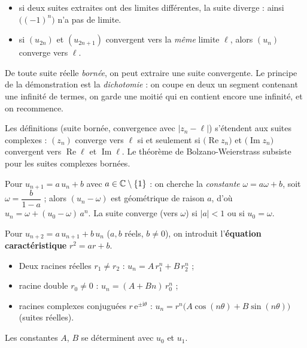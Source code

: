 \begin{propriete}
\begin{itemize}[label={\color{otNavy}\textbullet},leftmargin=1.4em,itemsep=0.6mm,topsep=0.8mm]
  \item {} si deux suites extraites ont des limites
    différentes, la suite diverge : ainsi $\bigl((-1)^{n}\bigr)$ n'a pas de
    limite.
  \item {} si $(u_{2n})$ et $(u_{2n+1})$ convergent vers la
    \emph{même} limite $\ell$, alors $(u_n)$ converge vers $\ell$.
\end{itemize}
\end{propriete}

\begin{theoreme}
De toute suite réelle \emph{bornée}, on peut extraire une suite convergente.
Le principe de la démonstration est la \emph{dichotomie} : on coupe en deux
un segment contenant une infinité de termes, on garde une moitié qui en
contient encore une infinité, et on recommence.
\end{theoreme}

\begin{definition}
Les définitions (suite bornée, convergence avec $|z_n-\ell|$) s'étendent aux
suites complexes : $(z_n)$ converge vers $\ell$ si et seulement si
$\bigl(\operatorname{Re}z_n\bigr)$ et $\bigl(\operatorname{Im}z_n\bigr)$
convergent vers $\operatorname{Re}\ell$ et $\operatorname{Im}\ell$.
Le théorème de Bolzano-Weierstrass subsiste pour les suites complexes
bornées.
\end{definition}


\begin{propriete}
Pour $u_{n+1}=a\,u_n+b$ avec $a\in\mathbb{C}\setminus\left\{1\right\}$ : on cherche la
\emph{constante} $\omega=a\omega+b$, soit $\omega=\dfrac{b}{1-a}$ ; alors
$(u_n-\omega)$ est géométrique de raison $a$, d'où
$u_n=\omega+(u_0-\omega)\,a^{n}$. La suite converge (vers $\omega$) si
$|a|<1$ ou si $u_0=\omega$.
\end{propriete}

\begin{theoreme}
Pour $u_{n+2}=a\,u_{n+1}+b\,u_n$ ($a,b$ réels, $b\neq0$), on introduit
l'\textbf{équation caractéristique} $r^{2}=ar+b$.
\begin{itemize}[label={\color{otNavy}\textbullet},leftmargin=1.4em,itemsep=0.6mm,topsep=0.8mm]
  \item Deux racines réelles $r_1\neq r_2$ : $u_n=A\,r_1^{n}+B\,r_2^{n}$ ;
  \item racine double $r_0\neq0$ : $u_n=(A+Bn)\,r_0^{n}$ ;
  \item racines complexes conjuguées $r\,\mathrm{e}^{\pm\mathrm{i}\theta}$ :
    $u_n=r^{n}\bigl(A\cos(n\theta)+B\sin(n\theta)\bigr)$ (suites réelles).
\end{itemize}
Les constantes $A$, $B$ se déterminent avec $u_0$ et $u_1$.
\end{theoreme}

